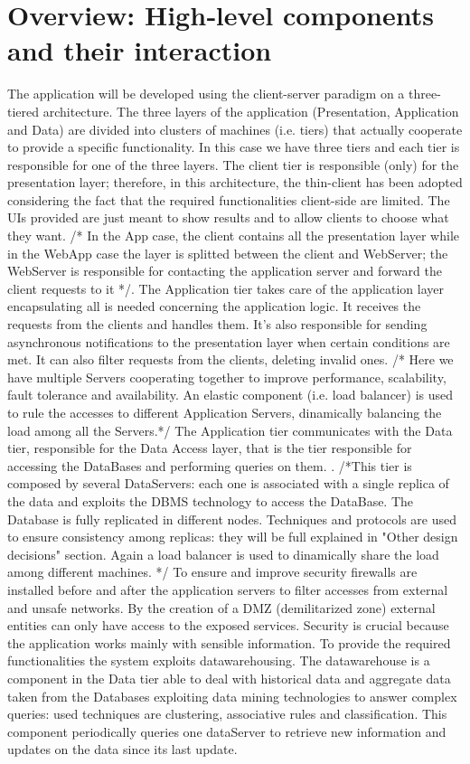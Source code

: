 \documentclass[a4paper]{report}
\begin{document}
\section{Overview: High­‐level components and their	interaction}
The application will be developed using the client-server paradigm on a three-tiered architecture. The three layers of the application (Presentation, Application and Data) are divided into clusters of machines (i.e. tiers) that actually cooperate to provide a specific functionality. In this case we have three tiers  and each tier is responsible for one of the three layers. The client tier is responsible (only) for the presentation layer; therefore, in this architecture, the thin-client has been adopted considering the fact that the required functionalities client-side are limited. The UIs provided are just meant to show results and to allow clients to choose what they want. /* In the App case, the client contains all the presentation layer while in the WebApp case the layer is splitted between the client and WebServer; the WebServer is responsible for contacting the application server and forward the client requests to it */. The Application tier takes care of the application layer encapsulating all is needed concerning the application logic. It receives the requests from the clients and handles them. It's also responsible for sending asynchronous notifications to the presentation layer when certain conditions are met. It can also filter requests from the clients, deleting invalid ones. /* Here we have multiple Servers cooperating together to improve performance, scalability, fault tolerance and availability. An elastic component (i.e. load balancer) is used to rule the accesses to different Application Servers, dinamically balancing the load among all the Servers.*/ The Application tier communicates with the Data tier, responsible for the Data Access layer, that is the tier responsible for accessing the DataBases and performing queries on them. . /*This tier is composed by several DataServers: each one is associated with a single replica of the data and exploits the DBMS technology to access the DataBase. The Database is fully replicated in different nodes. Techniques and protocols are used to ensure consistency among replicas: they will be full explained in "Other design decisions" section. Again a load balancer is used to dinamically share the load among different machines. */
To ensure and improve security firewalls are installed before and after the application servers to filter accesses from external and unsafe networks. By the creation of a DMZ (demilitarized zone) external entities can only have access to the exposed services. Security is crucial because the application works mainly with sensible information.
To provide the required functionalities the system exploits datawarehousing. The datawarehouse is a component in the Data tier able to deal with historical data and aggregate data taken from the Databases exploiting data mining technologies to answer complex queries: used techniques are clustering, associative rules and classification. This component periodically queries one dataServer to retrieve new information and updates on the data since its last update. 
\end{document}
